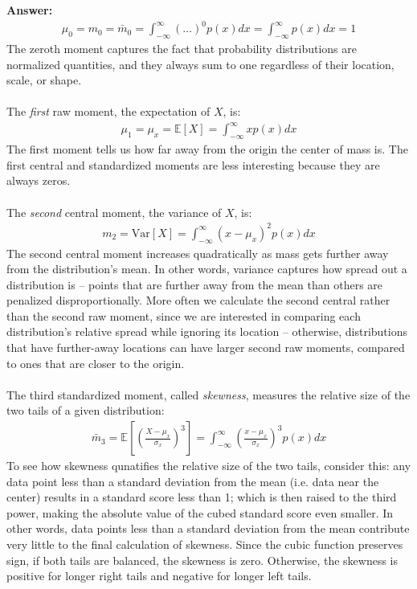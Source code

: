 \documentclass{article}
\newenvironment{QandA}{\begin{enumerate}[label=\arabic*.]}{\end{enumerate}}
\newenvironment{answer}{\par\normalfont \textbf{Answer:}}{}
\newcommand{\Exp}[1]{\mathbb{E}\left[ #1 \right]}
\newcommand{\Vari}[1]{\text{Var}\left[ #1 \right]}
\begin{document}
\begin{QandA}
\begin{answer}
\begin{align*}
            \mu_0 = m_0 = \bar{m}_0 = \int_{-\infty}^{\infty} \left( \ldots \right)^0 p(x)dx = \int_{-\infty}^{\infty} p(x)dx = 1
        \end{align*}
        The zeroth moment captures the fact that probability distributions are normalized quantities, and they always sum to one regardless of their location, scale, or shape. \\\\
        The \textit{first} raw moment, the expectation of $X$, is:
        \begin{align*}
            \mu_1 = \mu_x = \Exp{X} = \int_{-\infty}^{\infty} x p(x)dx
        \end{align*}
        The first moment tells us how far away from the origin the center of mass is. The first central and standardized moments are less interesting because they are always zeros.\\\\
        The \textit{second} central moment, the variance of $X$, is:
        \begin{align*}
            m_2 = \Vari{X} = \int_{-\infty}^{\infty} (x-\mu_x)^2 p(x) dx
        \end{align*}
        The second central moment increases quadratically as mass gets further away from the distribution’s mean. In other words, variance captures how spread out a distribution is -- points that are further away from the mean than others are penalized disproportionally. More often we calculate the second central rather than the second raw moment, since we are interested in comparing each distribution's relative spread while ignoring its location -- otherwise, distributions that have further-away locations can have larger second raw moments, compared to ones that are closer to the origin.\\\\
        The third standardized moment, called \textit{skewness}, measures the relative size of the two tails of a given distribution:
        \begin{align*}
            \bar{m}_3 = \Exp{\left( \frac{X - \mu_x}{\sigma_x} \right)^3} = \int_{-\infty}^{\infty} \left( \frac{x - \mu_x}{\sigma_x}\right)^3 p(x) dx
        \end{align*}
        To see how skewness qunatifies the relative size of the two tails, consider this: any data point less than a standard deviation from the mean (i.e. data near the center) results in a standard score less than 1; which is then raised to the third power, making the absolute value of the cubed standard score even smaller. In other words, data points less than a standard deviation from the mean contribute very little to the final calculation of skewness. Since the cubic function preserves sign, if both tails are balanced, the skewness is zero. Otherwise, the skewness is positive for longer right tails and negative for longer left tails. \\\\

\end{answer}
\end{QandA}
\end{document}
